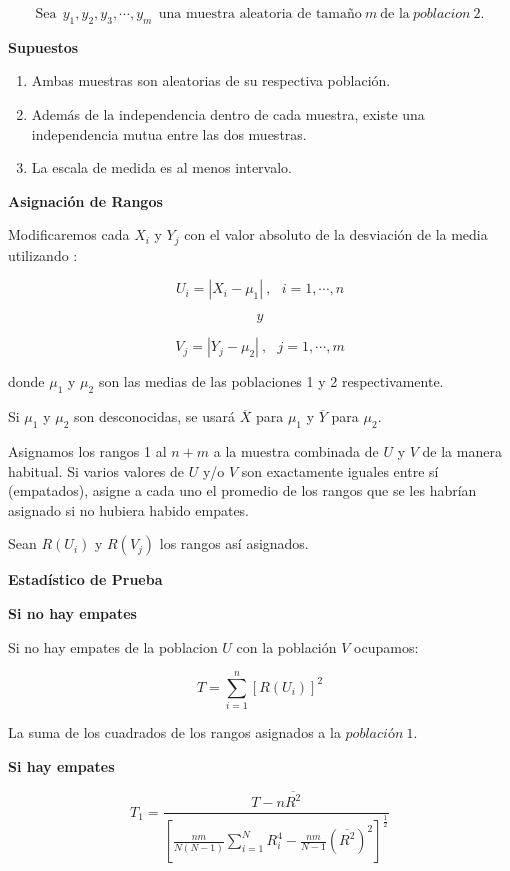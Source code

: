 \documentclass[
  a4paper,
  oneside,
  openany]{book}
\begin{document}
\[\mbox{Sea} \ \ y_{1},y_{2},y_{3},\cdots,y_{m} \ \ \mbox{una muestra aleatoria de tamaño} \ m \  \mbox{de la} \ poblacion\ 2.\]

\textbf{Supuestos}

\begin{enumerate}
\def\labelenumi{\arabic{enumi})}
\item
  Ambas muestras son aleatorias de su respectiva población.
\item
  Además de la independencia dentro de cada muestra, existe una independencia mutua entre las dos muestras.
\item
  La escala de medida es al menos intervalo.
\end{enumerate}

\textbf{Asignación de Rangos}

Modificaremos cada \(X_{i}\) y \(Y_{j}\) con el valor absoluto de la desviación de la media utilizando :

\[U_{i} = |X_{i}-\mu_{1}| \ , \ \ \ i=1,\cdots,n\]

\[y\]

\[V_{j} = |Y_{j}-\mu_{2}|\  ,\ \ \ j=1,\cdots,m\]

donde \(\mu_{1}\) y \(\mu_{2}\) son las medias de las poblaciones 1 y 2 respectivamente.

Si \(\mu_{1}\) y \(\mu_{2}\) son desconocidas, se usará \(\overline{X}\) para \(\mu_{1}\) y \(\overline{Y}\) para \(\mu_{2}\).

Asignamos los rangos 1 al \(n + m\) a la muestra combinada de \(U\) y \(V\) de la manera habitual.
Si varios valores de \(U\) y/o \(V\) son exactamente iguales entre sí (empatados), asigne a cada uno el promedio de los rangos que se les habrían asignado si no hubiera habido empates.

Sean \(R(U_{i})\) y \(R(V_{j})\) los rangos así asignados.

\textbf{Estadístico de Prueba}

\textbf{Si no hay empates}

Si no hay empates de la poblacion \(U\) con la población \(V\) ocupamos:

\[T=\sum_{i=1}^{n}[R(U_{i})]^2\]

La suma de los cuadrados de los rangos asignados a la \(población \ 1\).

\textbf{Si hay empates}

\[T_{1} = \frac{T-n\overline{R^2}}{\left[\frac{nm}{N(N-1)}\sum_{i=1}^{N}R_{i}^4-\frac{nm}{N-1}(\overline{R^2})^2\right]^\frac{1}{2}}\]
\end{document}
